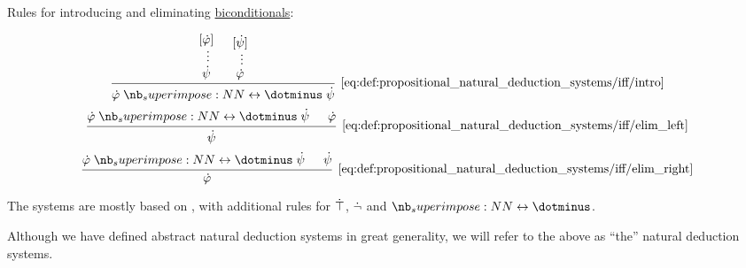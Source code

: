 \begin{definition}
\begin{thmenum}
    \mimprovised Rules for introducing and eliminating \hyperref[def:propositional_alphabet/connectives/biconditional]{biconditionals}:
    \begin{ThreeColumns}
      \begin{equation*}\taglabel[\( \leftrightarrow^+ \)]{eq:def:propositional_natural_deduction_systems/iff/intro}
        \begin{prooftree}
          \hypo{ [\syn\varphi] }
          \ellipsis {} { \syn\psi }
          \hypo{ [\syn\psi] }
          \ellipsis {} { \syn\varphi }
          \infer2[\ref{eq:def:propositional_natural_deduction_systems/iff/intro}]{ \syn\varphi \syniff \syn\psi }
        \end{prooftree}
      \end{equation*}
    \BeginSecondColumn
      \begin{equation*}\taglabel[\( \leftrightarrow^{-_L} \)]{eq:def:propositional_natural_deduction_systems/iff/elim_left}
        \begin{prooftree}
          \hypo{ \syn\varphi \syniff \syn\psi }
          \hypo{ \syn\varphi }
          \infer2[\ref{eq:def:propositional_natural_deduction_systems/iff/elim_left}]{ \syn\psi }
        \end{prooftree}
      \end{equation*}
    \BeginThirdColumn
      \begin{equation*}\taglabel[\( \leftrightarrow^{-_R} \)]{eq:def:propositional_natural_deduction_systems/iff/elim_right}
        \begin{prooftree}
          \hypo{ \syn\varphi \syniff \syn\psi }
          \hypo{ \syn\psi }
          \infer2[\ref{eq:def:propositional_natural_deduction_systems/iff/elim_right}]{ \syn\varphi }
        \end{prooftree}
      \end{equation*}
    \end{ThreeColumns}
  \end{thmenum}
\end{definition}
\begin{comments}
  \item The systems are mostly based on \cite[def. 2.1.1]{TroelstraSchwichtenberg2000}, with additional rules for \( \dot\top \), \( \dot\neg \) and \( \syniff \).
  \item Although we have defined abstract natural deduction systems in great generality, we will refer to the above as \enquote{the} natural deduction systems.
\end{comments}

